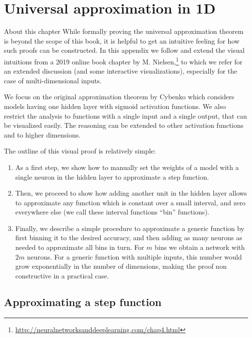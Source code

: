 \chapter{Universal approximation in 1D}
\label{sec:universal_approximation}

\begin{supportbox}{About this chapter}
While formally proving the universal approximation theorem is beyond the scope of this book, it is helpful to get an intuitive feeling for how such proofs can be constructed. In this appendix we follow and extend the visual intuitions from a 2019 online book chapter by M. Nielsen,\footnote{\url{http://neuralnetworksanddeeplearning.com/chap4.html}} to which we refer for an extended discussion (and some interactive visualizations), especially for the case of multi-dimensional inputs.
\end{supportbox}

We focus on the original approximation theorem by Cybenko \cite{cybenko1989approximation} which considers models having one hidden layer with sigmoid activation functions. We also restrict the analysis to functions with a single input and a single output, that can be visualized easily. The reasoning can be extended to other activation functions and to higher dimensions.

The outline of this visual proof is relatively simple: 

\begin{enumerate}
\item As a first step, we show how to manually set the weights of a model with a single neuron in the hidden layer to approximate a step function.
\item Then, we proceed to show how adding another unit in the hidden layer allows to approximate any function which is constant over a small interval, and zero everywhere else (we call these interval functions “bin” functions). 
\item Finally, we describe a simple procedure to approximate a generic function by first binning it to the desired accuracy, and then adding as many neurons as needed to approximate all bins in turn. For $m$ bins we obtain a network with $2m$ neurons. For a generic function with multiple inputs, this number would grow exponentially in the number of dimensions, making the proof non constructive in a practical case.
\end{enumerate}

\section{Approximating a step function}

